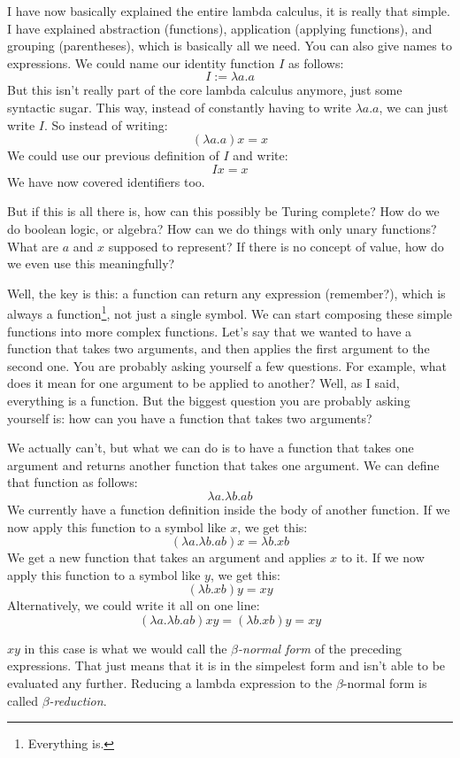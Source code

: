 \documentclass[11pt]{article}
\begin{document}
I have now basically explained the entire lambda calculus, it is really that
simple. I have explained abstraction (functions), application (applying
functions), and grouping (parentheses), which is basically all we need. You
can also give names to expressions. We could name our identity function \(I\)
as follows: \[I:=\lambda a.a\] But this isn't really part of the core lambda
calculus anymore, just some syntactic sugar. This way, instead of constantly
having to write \(\lambda a.a\), we can just write \(I\). So instead of
writing: \[(\lambda a.a)x=x\] We could use our previous definition of \(I\) and
write: \[Ix=x\] We have now covered identifiers too.

But if this is all there is, how can this possibly be Turing complete? How do
we do boolean logic, or algebra? How can we do things with only unary
functions? What are \(a\) and \(x\) supposed to represent? If there is no
concept of value, how do we even use this meaningfully?

Well, the key is this: a function can return any expression (remember?), which
is always a function\footnote{Everything is.}, not just a single symbol. We can
start composing these simple functions into more complex functions. Let's say
that we wanted to have a function that takes two arguments, and then applies
the first argument to the second one. You are probably asking yourself a few
questions. For example, what does it mean for one argument to be applied to
another? Well, as I said, everything is a function. But the biggest question
you are probably asking yourself is: how can you have a function that takes two
arguments?

We actually can't, but what we can do is to have a function that takes one
argument and returns another function that takes one argument. We can define
that function as follows:
\[\lambda a.\lambda b.ab\]
We currently have a function definition inside the body of another function. If
we now apply this function to a symbol like \(x\), we get this:
\[(\lambda a.\lambda b.ab)x=\lambda b.xb\]
We get a new function that takes an argument and applies \(x\) to it. If we now
apply this function to a symbol like \(y\), we get this:
\[(\lambda b.xb)y=xy\]
Alternatively, we could write it all on one line:
\[(\lambda a.\lambda b.ab)xy=(\lambda b.xb)y=xy\]

\(xy\) in this case is what we would call the \emph{\(\beta\)-normal form} of
the preceding expressions. That just means that it is in the simpelest form and
isn't able to be evaluated any further. Reducing a lambda expression to the
\(\beta\)-normal form is called \emph{\(\beta\)-reduction}.
\end{document}
